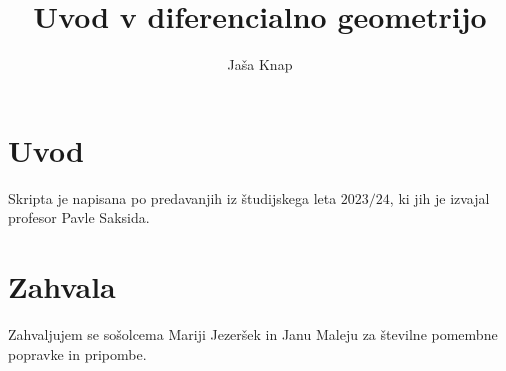 \documentclass[10pt, a4paper]{article}
\begin{document}
\title{Uvod v diferencialno geometrijo}
\author{Jaša Knap}
\maketitle

\section*{Uvod}
Skripta je napisana po predavanjih iz študijskega leta $2023/24$, ki jih je izvajal profesor Pavle Saksida. 

\section*{Zahvala}
Zahvaljujem se sošolcema Mariji Jezeršek in Janu Maleju za številne pomembne popravke in pripombe.  





\end{document}
